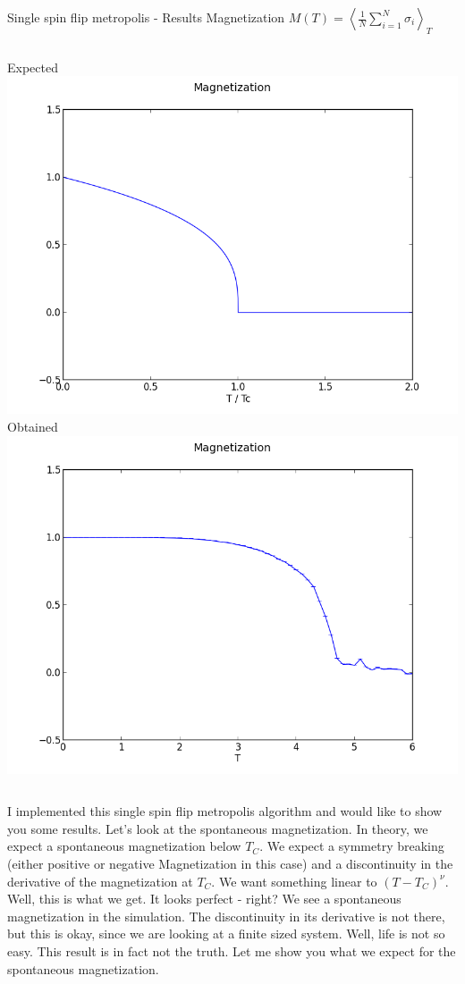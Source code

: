 \documentclass[]{beamer}
\begin{document}
\begin{frame}{Single spin flip metropolis - Results}
\pause
Magnetization \( M(T) = \left< \frac{1}{N} \sum\limits_{i=1}^N \sigma_i \right>_T \)
\begin{columns}[c]
	\pause
	\centering Expected
	\includegraphics[width=\textwidth]{img/single_magnetization_theoretical.png}
	\pause
	\centering Obtained
	\includegraphics[width=\textwidth]{img/single_magnetization_size15.png}
\end{columns}
 {I implemented this single spin flip metropolis algorithm and would like to show you some results.}
 {Let's look at the spontaneous magnetization.}
 {In theory, we expect a spontaneous magnetization below \(T_C\). We expect a symmetry breaking (either positive or negative Magnetization in this case) and a discontinuity in the derivative of the magnetization at \(T_C\). We want something linear to \( (T-T_C)^\nu \).}
 {Well, this is what we get. It looks perfect - right? We see a spontaneous magnetization in the simulation. The discontinuity in its derivative is not there, but this is okay, since we are looking at a finite sized system.
Well, life is not so easy. This result is in fact not the truth. Let me show you what we expect for the spontaneous magnetization.}
\end{frame}
\end{document}
